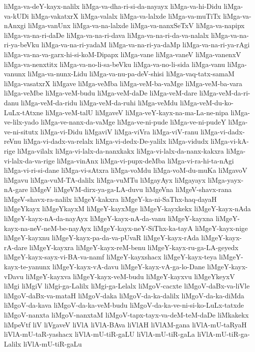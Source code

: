 {liMga-va-deY-kayx-nalilx
liMga-va-dha-ri-si-da-nayayx
liMga-va-hi-Didu
liMga-va-kUDi
liMga-vakatxrX
liMga-valalx
liMga-va-lalxde
liMga-va-muTiTx
liMga-va-nAnxgi
liMga-vanUnx
liMga-va-na-lalxde
liMga-va-nanxSeTxV
liMga-va-napipx
liMga-va-na-ri-daDe
liMga-va-na-ri-dava
liMga-va-na-ri-da-va-nalalx
liMga-va-na-ri-ya-beVku
liMga-va-na-ri-yadaM
liMga-va-na-ri-ya-daMp
liMga-va-na-ri-ya-rAgi
liMga-va-na-va-garx-hi-si-koM-Dipapx
liMga-vane
liMga-vaneV
liMga-vanenxV
liMga-va-nenxtitx
liMga-va-no-li-sa-beVku
liMga-va-no-li-sida
liMga-vanu
liMga-vanunx
liMga-va-nunx-Lidu
liMga-va-nu-pa-deV-shisi
liMga-vaq-tatx-samaM
liMga-vasatxrX
liMgave
liMga-veMba
liMga-veM-ba-vaMge
liMga-veM-ba-vara
liMga-veMbe
liMga-veM-budu
liMga-veM-daDe
liMga-veM-dare
liMga-veM-da-ri-danu
liMga-veM-da-ridu
liMga-veM-da-ruhi
liMga-veMdu
liMga-veM-du-ko-LuLx-tAtxne
liMga-veM-talU
liMgaveV
liMga-veY-kayx-na-ma-La-ne-nipa
liMga-ve-lilx-yado
liMga-ve-nanx-da-vaMge
liMga-ve-ni-pude
liMga-ve-ni-pudeY
liMga-ve-ni-situtx
liMga-vi-Didu
liMgaviV
liMga-viVra
liMga-viV-ranu
liMga-vi-dadx-reVnu
liMga-vi-dadx-va-relalx
liMga-vi-dedx-De-yalilx
liMga-vidudx
liMga-vi-kA-rige
liMga-vilalx
liMga-vi-lalx-da-nanxkakx
liMga-vi-lalx-da-nanx-kakxra
liMga-vi-lalx-da-va-rige
liMga-vinAnx
liMga-vi-pupx-deMba
liMga-vi-ra-hi-ta-nAgi
liMga-vi-ri-si-dane
liMga-vi-sAtxra
liMga-voMdu
liMga-voM-du-muKa
liMgavoV
liMgavu
liMga-vuM-TA-dalilx
liMga-vuMTu
liMgayAyx
liMgayayx
liMga-yayx-nA-gare
liMgeV
liMgeVM-dirx-ya-ga-LA-duvu
liMgeVna
liMgeV-shavx-rana
liMgeV-shavx-ra-nalilx
liMgeY-kakxra
liMgeY-ka-ni-SaThx-haq-dayaH
liMgeYkayx
liMgeYkayxM
liMgeY-kayxMge
liMgeY-kayxkekx
liMgeY-kayx-nAda
liMgeY-kayx-nA-da-nayAyx
liMgeY-kayx-nA-da-vanu
liMgeY-kayxna
liMgeY-kayx-na-neV-neM-be-nayAyx
liMgeY-kayx-neY-SiThx-ka-tayA
liMgeY-kayx-nige
liMgeY-kayxnu
liMgeY-kayx-pa-da-va-pUvaR
liMgeY-kayx-rAda
liMgeY-kayx-rA-dare
liMgeY-kayxra
liMgeY-kayx-reM-benu
liMgeY-kayx-ru-ga-LA-geyedx
liMgeY-kayx-sayx-vi-BA-va-namf
liMgeY-kayxshacx
liMgeY-kayx-teya
liMgeY-kayx-te-yanunx
liMgeY-kayx-vA-davu
liMgeY-kayx-vA-ga-lo-Dane
liMgeY-kayx-vDavu
liMgeY-kayxva
liMgeY-kayx-veM-budu
liMgeY-kayxvu
liMgeYkeyxV
liMgi
liMgiV
liMgi-ga-Lalilx
liMgi-ga-Lelalx
liMgoV-cacxte
liMgoV-daBx-va-liVle
liMgoV-daBx-va-mataH
liMgoV-daka
liMgoV-da-ka-dalilx
liMgoV-da-ka-diMda
liMgoV-da-kava
liMgoV-da-ka-veM-budu
liMgoV-da-ka-ve-ni-si-ko-LuLx-tatxde
liMgoV-nanxta
liMgoV-nanxtaM
liMgoV-tapx-tayx-va-deM-teM-daDe
liMkakekx
liMpeVtf
liV
liVgaveV
liVlA
liVlA-BAva
liVlAH
liVlAM-gana
liVlA-mU-taRyaH
liVlA-mU-taR-yashacx
liVlA-mU-tiR-gaLU
liVlA-mU-tiR-gaLa
liVlA-mU-tiR-ga-Lalilx
liVlA-mU-tiR-gaLu
}
